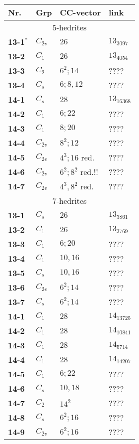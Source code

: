 \documentclass[12pt]{article}
\begin{document}
\begin{table}
\begin{center}
{\small
\begin{minipage}{7cm}
\begin{tabular}{||l|l|l|l||}
\hline
Nr.	&Grp 	&CC-vector	&link\\\hline
\multicolumn{4}{||c||}{$5$-hedrites}\\\hline
{\bf 13-1${}^*$}&$C_{2v}$	&$26$		&$13_{3097}$\\
{\bf 13-2}	&$C_1$	&$26$		&$13_{4054}$\\
{\bf 13-3}	&$C_2$	&$6^2; 14$	&????\\
{\bf 13-4}	&$C_s$	&$6; 8, 12$	&????\\\hline
{\bf 14-1}	&$C_s$	&$28$		&$13_{16368}$\\
{\bf 14-2}	&$C_1$	&$6; 22$		&????\\
{\bf 14-3}	&$C_1$	&$8; 20$		&????\\
{\bf 14-4}	&$C_{2v}$	&$8^2; 12$	&????\\
{\bf 14-5}	&$C_{2v}$	&$4^3; 16$ red.	&????\\
{\bf 14-6}	&$C_{2v}$	&$6^2; 8^2$ red.!!	&????\\
{\bf 14-7}	&$C_{2v}$	&$4^3, 8^2$ red.	&????\\\hline
\hline
\multicolumn{4}{||c||}{$7$-hedrites}\\\hline
{\bf 13-1}	&$C_s$	&$26$		&$13_{3861}$\\
{\bf 13-2}	&$C_1$	&$26$		&$13_{3769}$\\
{\bf 13-3}	&$C_1$	&$6; 20$		&????\\
{\bf 13-4}	&$C_1$	&$10, 16$		&????\\
{\bf 13-5}	&$C_s$	&$10, 16$		&????\\
{\bf 13-6}	&$C_{2v}$	&$6^2; 14$	&????\\
{\bf 13-7}	&$C_{s}$	&$6^2; 14$	&????\\\hline
{\bf 14-1}	&$C_1$	&$28$		&$14_{13725}$\\
{\bf 14-2}	&$C_1$	&$28$		&$14_{10841}$\\
{\bf 14-3}	&$C_1$	&$28$		&$14_{5714}$\\
{\bf 14-4}	&$C_1$	&$28$		&$14_{14207}$\\
{\bf 14-5}	&$C_1$	&$6; 22$		&????\\
{\bf 14-6}	&$C_s$	&$10, 18$		&????\\
{\bf 14-7}	&$C_2$	&$14^2$		&????\\
{\bf 14-8}	&$C_s$	&$6^2; 16$	&????\\
{\bf 14-9}	&$C_{2v}$	&$6^2; 16$	&????\\\hline

\end{tabular}
\end{minipage}}
\end{center}
\end{table}
\end{document}
